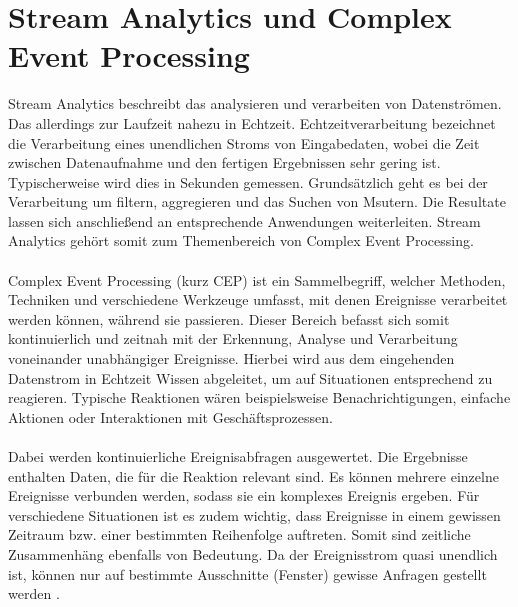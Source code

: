 \section{Stream Analytics und Complex Event Processing}
Stream Analytics beschreibt das analysieren und verarbeiten von Datenströmen. Das allerdings zur Laufzeit nahezu in Echtzeit. Echtzeitverarbeitung bezeichnet die Verarbeitung eines unendlichen Stroms von Eingabedaten, wobei die Zeit zwischen Datenaufnahme und den fertigen Ergebnissen sehr gering ist. Typischerweise wird dies in Sekunden gemessen. Grundsätzlich geht es bei der Verarbeitung um filtern, aggregieren und das Suchen von Msutern. Die Resultate lassen sich anschließend an entsprechende Anwendungen weiterleiten.  Stream Analytics gehört somit zum Themenbereich von Complex Event Processing.\\ \\ 
Complex Event Processing (kurz CEP) ist ein Sammelbegriff, welcher Methoden, Techniken und verschiedene Werkzeuge umfasst, mit denen Ereignisse verarbeitet werden können, während sie passieren. Dieser Bereich befasst sich somit kontinuierlich und zeitnah mit der Erkennung, Analyse und Verarbeitung voneinander unabhängiger Ereignisse. Hierbei wird aus dem eingehenden Datenstrom in Echtzeit Wissen abgeleitet, um auf Situationen entsprechend zu reagieren. Typische Reaktionen wären beispielsweise Benachrichtigungen, einfache Aktionen oder Interaktionen mit Geschäftsprozessen. \\ \\
Dabei werden kontinuierliche Ereignisabfragen ausgewertet. Die Ergebnisse enthalten Daten, die für die Reaktion relevant sind. Es können mehrere einzelne Ereignisse verbunden werden, sodass sie ein komplexes Ereignis ergeben. Für verschiedene Situationen ist es zudem wichtig, dass Ereignisse in einem gewissen Zeitraum bzw. einer bestimmten Reihenfolge auftreten. Somit sind zeitliche Zusammenhäng ebenfalls von Bedeutung. Da der Ereignisstrom quasi unendlich ist, können nur auf bestimmte Ausschnitte (Fenster) gewisse Anfragen gestellt werden \cite{GesellschaftfurInformatik.2009}. \\ \\
